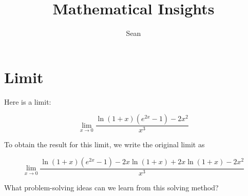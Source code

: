 \documentclass[a4paper,12pt]{book}
\begin{document}
	
\title{Mathematical Insights}
\author{Sean}

\maketitle

\tableofcontents

\newpage

\chapter{Limit}

\begin{pbox}
Here is a limit:

\[\lim_{x\to 0} \frac{\ln{(1+x)}(e^{2x}-1)-2x^2}{x^3}\]

To obtain the result for this limit, we write the original limit as

\[\lim_{x\to 0} \frac{\ln(1+x)(e^{2x}-1)-2x\ln(1+x)+2x\ln(1+x)-2x^2}{x^3}\]

What problem-solving ideas can we learn from this solving method?
\end{pbox}
\end{document}
